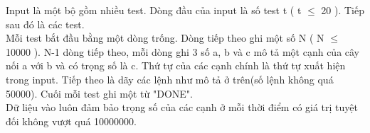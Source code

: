 Input là một bộ gồm nhiều test. Dòng đầu của input là số test t ( t $\le$ 20 ). Tiếp sau đó là các test.   
\\   Mỗi test bắt đầu bằng một dòng trống. Dòng tiếp theo ghi một số N ( N $\le$ 10000 ). N-1 dòng tiếp theo, mỗi dòng ghi 3 số a, b và c mô tả một cạnh của cây nối a với b và có trọng số là c. Thứ tự của các cạnh chính là thứ tự xuất hiện trong input. Tiếp theo là dãy các lệnh như mô tả ở trên(số lệnh không quá 50000). Cuối mỗi test ghi một từ "DONE".   
\\   Dữ liệu vào luôn đảm bảo trọng số của các cạnh ở mỗi thời điểm có giá trị tuyệt đối không vượt quá 10000000.